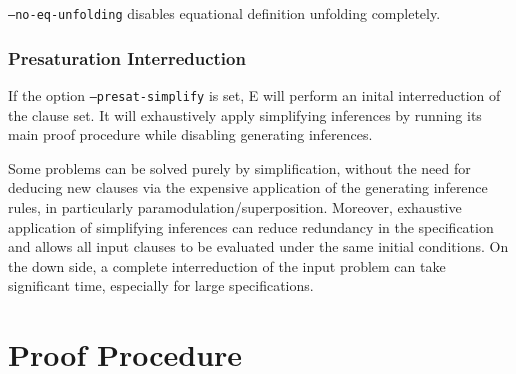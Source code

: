\documentclass{report}
\begin{document}
\texttt{--no-eq-unfolding} disables equational definition unfolding
completely.



\subsubsection{Presaturation Interreduction}
\label{sec:presat}

If the option \texttt{--presat-simplify} is set, E will perform an
inital interreduction of the clause set. It will
exhaustively apply simplifying inferences by running its main proof
procedure while disabling generating inferences.

Some problems can be solved purely by simplification, without the need
for deducing new clauses via the expensive application of the
generating inference rules, in particularly
paramodulation/superposition. Moreover, exhaustive application of
simplifying inferences can reduce redundancy in the specification and
allows all input clauses to be evaluated under the same initial
conditions. On the down side, a complete interreduction of the input
problem can take significant time, especially for large
specifications.



\section{Proof Procedure}
\label{sec:procedure}
\end{document}

